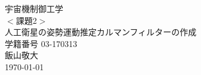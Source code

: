 \documentclass[class=article, crop=false, dvipdfmx, fleqn]{standalone}
\begin{document}
  \begin{titlepage}
  \begin{center}
  \vspace*{80truept}
  {\huge 宇宙機制御工学}\\ %
  \vspace{15truept}
  {\huge $<$課題2$>$} \\
  \vspace{10truept}
  {\huge 人工衛星の姿勢運動推定カルマンフィルターの作成}\\ %
  \vspace{150truept}
  {\large 学籍番号 03-170313}\\ %
  \vspace{10truept}
  {\large 飯山敬大}\\ %
  \vspace{10truept}
  {\large \today}\\ %
  \end{center}
  \end{titlepage}
\end{document}
